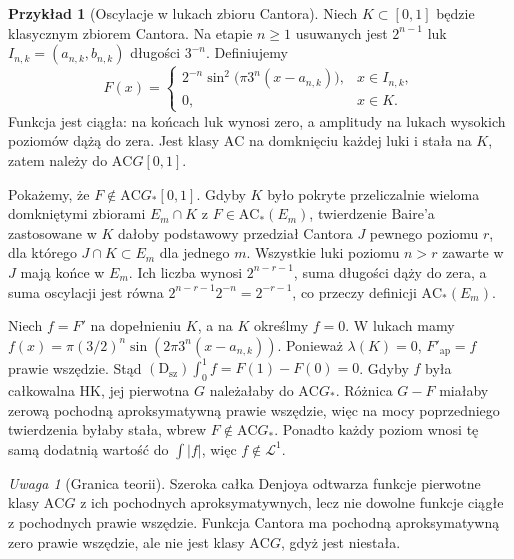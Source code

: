 \documentclass[11pt,a4paper]{article}
\numberwithin{equation}{section}
\theoremstyle{plain}
\theoremstyle{definition}
\newtheorem{przyklad}[twierdzenie]{Przykład}
\theoremstyle{remark}
\newtheorem{uwaga}[twierdzenie]{Uwaga}
\newcommand{\AC}{\mathrm{AC}}
\begin{document}
\begin{przyklad}[Oscylacje w lukach zbioru Cantora]
Niech $K\subset[0,1]$ będzie klasycznym zbiorem Cantora. Na etapie $n\ge1$ usuwanych jest $2^{n-1}$ luk $I_{n,k}=(a_{n,k},b_{n,k})$ długości $3^{-n}$. Definiujemy
\[
F(x)=\begin{cases}
2^{-n}\sin^2\!\bigl(\pi3^n(x-a_{n,k})\bigr),&x\in I_{n,k},\\
0,&x\in K.
\end{cases}
\]
Funkcja jest ciągła: na końcach luk wynosi zero, a amplitudy na lukach wysokich poziomów dążą do zera. Jest klasy $\AC$ na domknięciu każdej luki i stała na $K$, zatem należy do $\AC G[0,1]$.

Pokażemy, że $F\notin\AC G_*[0,1]$. Gdyby $K$ było pokryte przeliczalnie wieloma domkniętymi zbiorami $E_m\cap K$ z $F\in\AC_*(E_m)$, twierdzenie Baire'a zastosowane w $K$ dałoby podstawowy przedział Cantora $J$ pewnego poziomu $r$, dla którego $J\cap K\subset E_m$ dla jednego $m$. Wszystkie luki poziomu $n>r$ zawarte w $J$ mają końce w $E_m$. Ich liczba wynosi $2^{n-r-1}$, suma długości dąży do zera, a suma oscylacji jest równa $2^{n-r-1}2^{-n}=2^{-r-1}$, co przeczy definicji $\AC_*(E_m)$.

Niech $f=F'$ na dopełnieniu $K$, a na $K$ określmy $f=0$. W lukach mamy
$f(x)=\pi(3/2)^n\sin(2\pi3^n(x-a_{n,k}))$.
Ponieważ $\lambda(K)=0$, $F'_{\mathrm{ap}}=f$ prawie wszędzie. Stąd $(\mathrm D_{\mathrm{sz}})\int_0^1 f=F(1)-F(0)=0$. Gdyby $f$ była całkowalna HK, jej pierwotna $G$ należałaby do $\AC G_*$. Różnica $G-F$ miałaby zerową pochodną aproksymatywną prawie wszędzie, więc na mocy poprzedniego twierdzenia byłaby stała, wbrew $F\notin\AC G_*$. Ponadto każdy poziom wnosi tę samą dodatnią wartość do $\int|f|$, więc $f\notin\mathcal L^1$.
\end{przyklad}
\begin{uwaga}[Granica teorii]
Szeroka całka Denjoya odtwarza funkcje pierwotne klasy $\AC G$ z ich pochodnych aproksymatywnych, lecz nie dowolne funkcje ciągłe z pochodnych prawie wszędzie. Funkcja Cantora ma pochodną aproksymatywną zero prawie wszędzie, ale nie jest klasy $\AC G$, gdyż jest niestała.
\end{uwaga}

\end{document}
